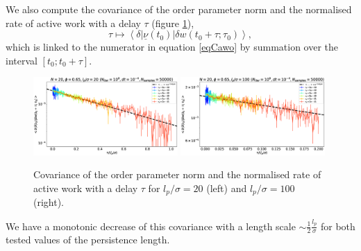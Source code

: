 \documentclass[10pt]{article}
\begin{document}
We also compute the covariance of the order parameter norm and the normalised rate of active work with a delay $\tau$ (figure \ref{covWorkOrder}),
\begin{equation}
\tau \mapsto \left<\delta |\underline{\nu}(t_0)| \delta w(t_0 + \tau; \tau_0)\right>,
\end{equation}
which is linked to the numerator in equation \ref{eqCawo} by summation over the interval $[t_0; t_0 + \tau]$.

\begin{figure}[H]
\centering
\includegraphics[width=0.49\textwidth]{corWorkOrderIns_Nm2000_Dk6500_Lm2000_Em1000_Ip5000.eps}
\hfill
\includegraphics[width=0.49\textwidth]{corWorkOrderIns_Nm2000_Dk6500_Ln1000_Em1000_Ip5000.eps}
\caption{Covariance of the order parameter norm and the normalised rate of active work with a delay $\tau$ for $l_p/\sigma = 20$ (left) and $l_p/\sigma = 100$ (right).}
\label{covWorkOrder}
\end{figure}

We have a monotonic decrease of this covariance with a length scale $\sim \frac{1}{2} \frac{l_p}{\sigma}$ for both tested values of the persistence length.



{\renewcommand{\bibname}{References}}
\end{document}
